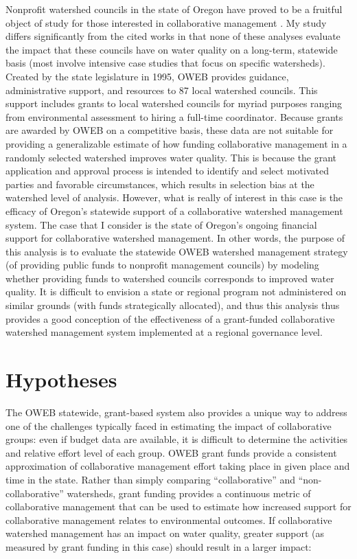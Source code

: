 \documentclass[11pt,a4paper,titlepage]{article}
\begin{document}
Nonprofit watershed councils in the state of Oregon have proved to be a fruitful object of study for those interested in collaborative management \parencite{griffin1999,dakins2005,margerum2002,margerum2007,margerum2008,margerum2011,habron2003,margerum2004,hibbard2006, lurie2008}. My study differs significantly from the cited works in that none of these analyses evaluate the impact that these councils have on water quality on a long-term, statewide basis (most involve intensive case studies that focus on specific watersheds). Created by the state legislature in 1995, OWEB provides guidance, administrative support, and resources to 87 local watershed councils. This support includes grants to local watershed councils for myriad purposes ranging from environmental assessment to hiring a full-time coordinator. Because grants are awarded by OWEB on a competitive basis, these data are not suitable for providing a generalizable estimate of how funding collaborative management in a randomly selected watershed improves water quality. This is because the grant application and approval process is intended to identify and select motivated parties and favorable circumstances, which results in selection bias at the watershed level of analysis. However, what is really of interest in this case is the efficacy of Oregon's statewide support of a collaborative watershed management system. The case that I consider is the state of Oregon’s ongoing financial support for collaborative watershed management. In other words, the purpose of this analysis is to evaluate the statewide OWEB watershed management strategy (of providing public funds to nonprofit management councils) by modeling whether providing funds to watershed councils corresponds to improved water quality. It is difficult to envision a state or regional program not administered on similar grounds (with funds strategically allocated), and thus this analysis thus provides a good conception of the effectiveness of a grant-funded collaborative watershed management system implemented at a regional governance level.

\section*{Hypotheses}

The OWEB statewide, grant-based system also provides a unique way to address one of the challenges typically faced in estimating the impact of collaborative groups: even if budget data are available, it is difficult to determine the activities and relative effort level of each group. OWEB grant funds provide a consistent approximation of collaborative management effort taking place in given place and time in the state. Rather than simply comparing “collaborative” and “non-collaborative” watersheds, grant funding provides a continuous metric of collaborative management that can be used to estimate how increased support for collaborative management relates to environmental outcomes. If collaborative watershed management has an impact on water quality, greater support (as measured by grant funding in this case) should result in a larger impact:
\end{document}
